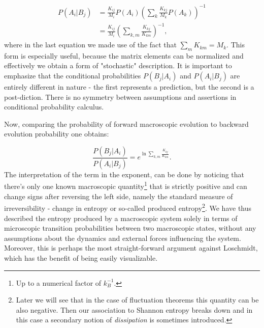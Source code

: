 \documentclass[a4paper,12pt]{article}
\begin{document}
\begin{equation}
\begin{aligned}
  P(A_i|B_j) &= \frac{K_{ij}}{M_i} P(A_i) \left( \sum_k \frac{K_{kj}}{M_k}P(A_k) \right)^{-1}\\
  &= \frac{K_{ij}}{M_i} \left( \sum_{k,m} \frac{K_{kj}}{K_{km}} \right)^{-1},
\end{aligned}
\end{equation}
where in the last equation we made use of the fact that $\sum_m K_{km}=M_k $.
This form is especially useful, because the matrix elements can be normalized and effectively we obtain a form of "stochastic" description.
It is important to emphasize that the conditional probabilities $P(B_j|A_i)$ and $P(A_i|B_j)$ are entirely different in nature - the first represents a prediction, but the second is a post-diction. There is no symmetry between assumptions and assertions in conditional probability calculus.

Now, comparing the probability of forward macroscopic evolution to backward evolution probability one obtains: 

\begin{equation}
\label{MacrostatesPRatio}
  \frac{P(B_j|A_i)}{P(A_i|B_j)}= e^{\ln{\sum_{k,m} \frac{K_{kj}}{K_{km}}}}.
\end{equation}
The interpretation of the term in the exponent, can be done by noticing that there's only one known macroscopic quantity\footnote{Up to a numerical factor of $k_B^{-1}$.} that is strictly positive and can change signs after reversing the left side, namely the standard measure of irreversibility - change in entropy or so-called produced entropy\footnote{Later we will see that in the case of fluctuation theorems this quantity can be also negative. Then our association to Shannon entropy breaks down and in this case a secondary notion of \textit{dissipation} is sometimes introduced.}.
We have thus described the entropy produced by a macroscopic system solely in terms of microscopic transition probabilities between two macroscopic states, without any assumptions about the dynamics and external forces influencing the system. Moreover, this is perhaps the most straight-forward argument against Loschmidt, which has the benefit of being easily visualizable.
\end{document}
